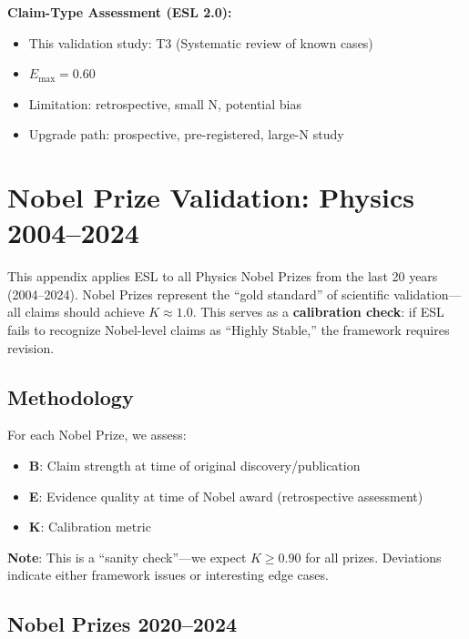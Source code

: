 \documentclass[11pt,a4paper]{article}
\begin{document}
\textbf{Claim-Type Assessment (ESL 2.0):}
\begin{itemize}
    \item This validation study: T3 (Systematic review of known cases)
    \item $E_{\max} = 0.60$
    \item Limitation: retrospective, small N, potential bias
    \item Upgrade path: prospective, pre-registered, large-N study
\end{itemize}


\section{Nobel Prize Validation: Physics 2004--2024}
\label{app:nobel-validation}

This appendix applies ESL to all Physics Nobel Prizes from the last 20 years (2004--2024). Nobel Prizes represent the ``gold standard'' of scientific validation---all claims should achieve $K \approx 1.0$. This serves as a \textbf{calibration check}: if ESL fails to recognize Nobel-level claims as ``Highly Stable,'' the framework requires revision.

\subsection{Methodology}

For each Nobel Prize, we assess:
\begin{itemize}
    \item \textbf{B}: Claim strength at time of original discovery/publication
    \item \textbf{E}: Evidence quality at time of Nobel award (retrospective assessment)
    \item \textbf{K}: Calibration metric
\end{itemize}

\textbf{Note}: This is a ``sanity check''---we expect $K \geq 0.90$ for all prizes. Deviations indicate either framework issues or interesting edge cases.

\subsection{Nobel Prizes 2020--2024}
\end{document}
